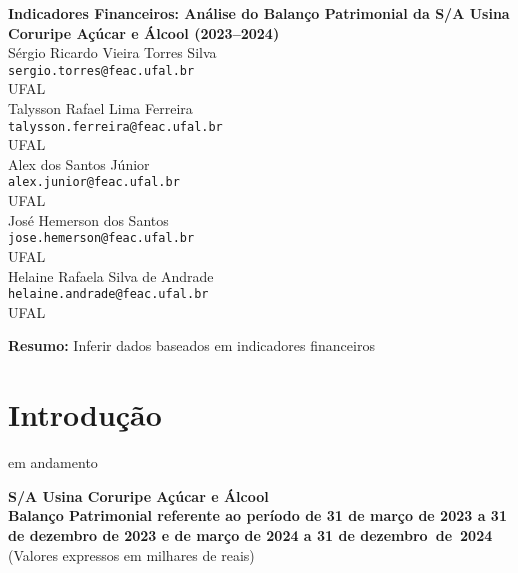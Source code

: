 \documentclass[1pt,a4paper]{article}
\begin{document}
	
	\begin{center}
		\LARGE \textbf{Indicadores Financeiros: Análise do Balanço Patrimonial da S/A Usina Coruripe Açúcar e Álcool (2023–2024)  
		 } \\[1cm]
		
		\large
		Sérgio Ricardo Vieira Torres Silva\\
		\texttt{sergio.torres@feac.ufal.br}\\
		UFAL\\[0.5cm]
		
		Talysson Rafael Lima Ferreira\\
		\texttt{talysson.ferreira@feac.ufal.br}\\
		UFAL\\[0.5cm]
		
		Alex dos Santos Júnior\\
		\texttt{alex.junior@feac.ufal.br}\\
		UFAL\\[0.5cm]
		
		José Hemerson dos Santos\\
		\texttt{jose.hemerson@feac.ufal.br}\\
		UFAL\\[0.5cm]
		
		Helaine Rafaela Silva de Andrade\\
		\texttt{helaine.andrade@feac.ufal.br}\\
		UFAL\\[0.5cm]
		
		
	
		
	
	\end{center}
	
	\vspace{1cm}
	
	\noindent \textbf{Resumo:} Inferir dados baseados em indicadores financeiros 
	
	
	\section{Introdução}
	
	\hspace*{1.5cm} em andamento
	
	\newpage
	
	
		
		\begin{center}
			\textbf{\Large S/A Usina Coruripe Açúcar e Álcool}\\
			\textbf{Balanço Patrimonial referente ao período de 31 de março de 2023 a 31 de dezembro de 2023 e de março de 2024 a 31 de dezembro de 2024}\\
			(Valores expressos em milhares de reais)
		\end{center}
		
\end{document}
